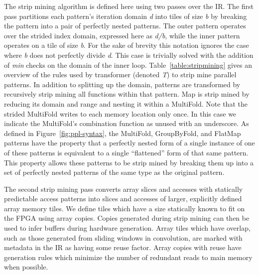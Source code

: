 The strip mining algorithm is defined here using two passes over the IR.
The first pass partitions each pattern's iteration domain \emph{d} into tiles of size \emph{b} by breaking the pattern into a pair of perfectly nested patterns.
The outer pattern operates over the strided index domain, expressed here as \emph{d/b}, while the inner pattern operates on a tile of size \emph{b}.
For the sake of brevity this notation ignores the case where \emph{b} does not perfectly divide \emph{d}.
This case is trivially solved with the addition of \emph{min} checks on the domain of the inner loop.
Table~\ref{table:stripmining} gives an overview of the rules used by transformer (denoted \emph{T}) to strip mine parallel patterns.
In addition to splitting up the domain, patterns are transformed by recursively strip mining all functions within that pattern.
Map is strip mined by reducing its domain and range and nesting it within a MultiFold. Note that the strided MultiFold writes
to each memory location only once. In this case we indicate the MultiFold's combination function as unused with an underscore.
As defined in Figure~\ref{fig:ppl-syntax}, the MultiFold, GroupByFold, and FlatMap patterns have the property that a perfectly nested form of a single instance of one of these
patterns is equivalent to a single ``flattened'' form of that same pattern. This property allows these patterns to be strip mined by
breaking them up into a set of perfectly nested patterns of the same type as the original pattern.

The second strip mining pass converts array slices and accesses with statically predictable access patterns into slices and accesses of larger, explicitly defined
array memory tiles. We define tiles which have a size statically known to fit on the FPGA using array copies.
Copies generated during strip mining can then be used to infer buffers during hardware generation.
Array tiles which have overlap, such as those generated from sliding windows in convolution, are marked with metadata in the IR as having some reuse factor.
Array copies with reuse have generation rules which minimize the number of redundant reads to main memory when possible.

